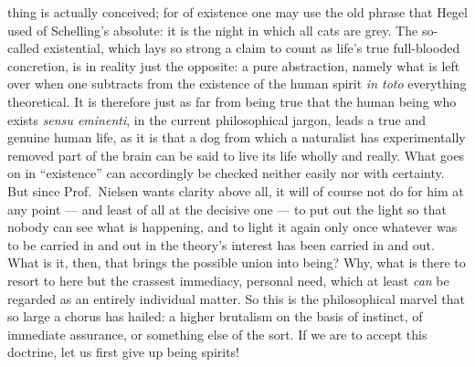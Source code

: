 \documentclass[12pt,a4paper]{book}
\newcommand{\opage}[1]{\marginnote{\footnotesize\textit{[#1]}}}
\begin{document}
thing is actually conceived; for of existence one may use the old phrase that
Hegel used of Schelling's absolute: it is the night in which all cats are grey.
\opage{27}The so-called existential, which lays so strong a claim to count as
life's true full-blooded concretion, is in reality just the opposite: a pure
abstraction, namely what is left over when one subtracts from the existence of
the human spirit \textit{in toto} everything theoretical. It is therefore just
as far from being true that the human being who exists \textit{sensu eminenti},
in the current philosophical jargon, leads a true and genuine human life, as it
is that a dog from which a naturalist has experimentally removed part of the
brain can be said to live its life wholly and really. What goes on in
``existence'' can accordingly be checked neither easily nor with certainty. But
since Prof.\ Nielsen wants clarity above all, it will of course not do for him
at any point --- and least of all at the decisive one --- to put out the light
so that nobody can see what is happening, and to light it again only once
whatever was to be carried in and out in the theory's interest has been carried
in and out. What is it, then, that brings the possible union into being? Why,
what is there to resort to here but the crassest immediacy, personal need,
which at least \emph{can} be regarded as an entirely individual matter. So this
is the philosophical marvel that so large a chorus has hailed: a higher
brutalism on the basis of instinct, of immediate assurance, or something else
of the sort. If we are to accept this doctrine, let us first give up being
spirits!
\end{document}
